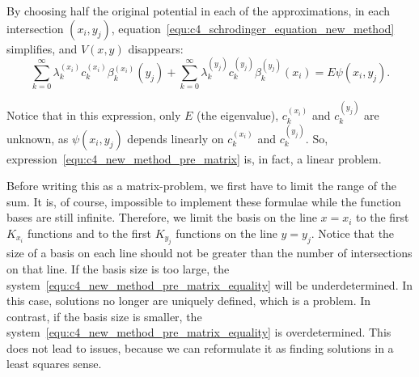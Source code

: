 By choosing half the original potential in each of the approximations, in each intersection $(x_i, y_j)$, equation~\eqref{equ:c4_schrodinger_equation_new_method} simplifies, and $V(x, y)$ disappears:
\begin{equation}\label{equ:c4_new_method_pre_matrix}
    \sum_{k=0}^\infty \lambda_k^{(x_i)} c_k^{(x_i)} \beta^{(x_i)}_k(y_j) + \sum_{k=0}^\infty \lambda_k^{(y_j)} c_k^{(y_j)} \beta_k^{(y_j)}(x_i) = E \psi(x_i, y_j) \text{.}
\end{equation}

Notice that in this expression, only $E$ (the eigenvalue), $c_k^{(x_i)}$ and $c_k^{(y_j)}$ are unknown, as $\psi(x_i, y_j)$ depends linearly on $c_k^{(x_i)}$ and $c_k^{(y_j)}$. So, expression~\eqref{equ:c4_new_method_pre_matrix} is, in fact, a linear problem.

Before writing this as a matrix-problem, we first have to limit the range of the sum. It is, of course, impossible to implement these formulae while the function bases are still infinite. Therefore, we limit the basis on the line $x = x_i$ to the first $K_{x_i}$ functions and to the first $K_{y_j}$ functions on the line $y = y_j$. Notice that the size of a basis on each line should not be greater than the number of intersections on that line. If the basis size is too large, the system~\eqref{equ:c4_new_method_pre_matrix_equality} will be underdetermined. In this case, solutions no longer are uniquely defined, which is a problem. In contrast, if the basis size is smaller, the system~\eqref{equ:c4_new_method_pre_matrix_equality} is overdetermined. This does not lead to issues, because we can reformulate it as finding solutions in a least squares sense.

